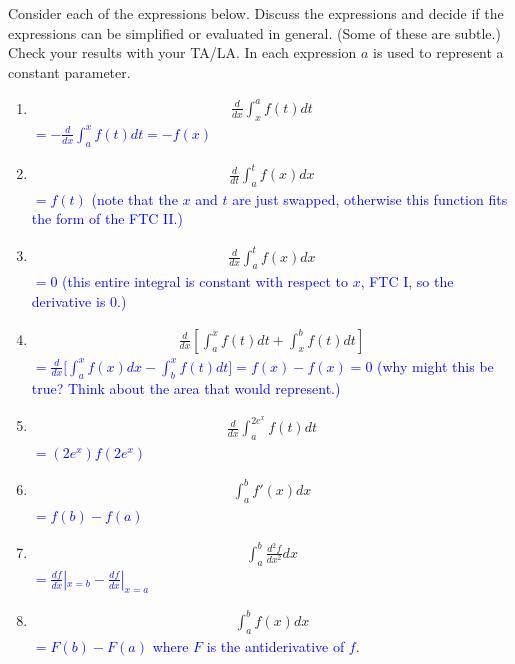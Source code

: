 \documentclass{ximera}
\begin{document}
\begin{exercise}
    Consider each of the expressions below. Discuss the expressions and decide if the expressions can be simplified or evaluated in general. (Some of these are subtle.) Check your results with your TA/LA. In each expression $a$ is used to represent a constant parameter.
    \begin{enumerate}
        \item \begin{align}	\frac{d}{dx} \int_{x}^a f(t)dt \nonumber\end{align}
        \textcolor{blue}{ $=-\frac{d}{dx}\int_{a}^x f(t)dt=-f(x)$}

        \item \begin{align}	\frac{d}{dt} \int_{a}^t f(x)dx \nonumber\end{align}
        \textcolor{blue}{ $=f(t)$ (note that the $x$ and $t$ are just swapped, otherwise this function fits the form of the FTC II.)}

        \item \begin{align}	\frac{d}{dx} \int_{a}^t f(x)dx \nonumber\end{align}
        \textcolor{blue}{ $=0$ (this entire integral is constant with respect to $x$, FTC I, so the derivative is 0.)} 

        \item \begin{align}	\frac{d}{dx}\left[ \int_{a}^x f(t)dt +  \int_{x}^b f(t)dt\right] \nonumber\end{align}
        \textcolor{blue}{ $=\frac{d}{dx}\bigg[\int_a^x f(x)dx-\int_b^x f(t)dt\bigg]=f(x)-f(x)=0$ (why might this be true?  Think about the area that would represent.)}

        \item \begin{align}   \frac{d}{dx} \int_{a}^{2e^x} f(t)d \nonumber t\end{align}
        \textcolor{blue}{ $=(2e^x)f(2e^{x})$}

        \item\begin{align}	\int_{a}^b f'(x)dx \nonumber\end{align}
        \textcolor{blue}{ $=f(b)-f(a)$}

        \item\begin{align}	\int_{a}^b \frac{d^2f}{dx^2}dx \nonumber\end{align}
        \textcolor{blue}{ $=\frac{df}{dx}|_{x=b}-\frac{df}{dx}|_{x=a}$}
        \item\begin{align}	\int_{a}^b f(x) dx \nonumber\end{align}
        \textcolor{blue}{ $=F(b)-F(a)$ where $F$ is the antiderivative of $f$.}

    \end{enumerate}
\end{exercise}
\end{document}
